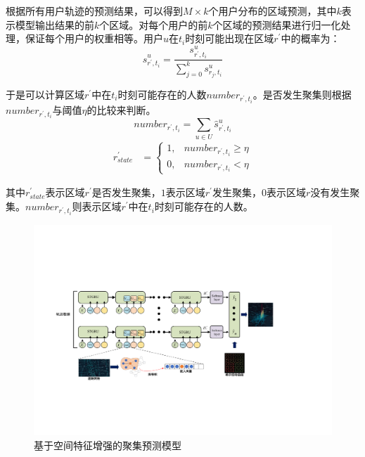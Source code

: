 \documentclass[master]{thesis-uestc}
\begin{document}
根据所有用户轨迹的预测结果，可以得到$M\times k$个用户分布的区域预测，其中$k$表示模型输出结果的前$k$个区域。对每个用户的前$k$个区域的预测结果进行归一化处理，保证每个用户的权重相等。用户$u$在$t_i$时刻可能出现在区域$r^{\prime}$中的概率为：
\begin{equation}
   \hat{s}^u_{r^{\prime},t_i} = \frac{s^u_{r^{\prime},t_i}}{\sum\limits_{j=0}^{k} s^u_{r_j,t_i}}
\end{equation}

于是可以计算区域$r^{\prime}$中在$t_i$时刻可能存在的人数$number_{r^{\prime},t_i}$。是否发生聚集则根据$number_{r^{\prime},t_i}$与阈值$\eta$的比较来判断。
\begin{equation}
   number_{r^{\prime},t_i} = \sum_{u\in U} \hat{s}^u_{r^{\prime},t_i}
\end{equation}
\begin{align}
    r^{\prime}_{state} &= 
        \begin{cases}
        1,& number_{r^{\prime},t_i}\ge \eta 
        \\
        0,& number_{r^{\prime},t_i}< \eta
        \end{cases}
\end{align}

其中$r^{\prime}_{state}$表示区域$r^{\prime}$是否发生聚集，$1$表示区域$r^{\prime}$发生聚集，$0$表示区域$r$没有发生聚集。$number_{r^{\prime},t_i}$则表示区域$r^{\prime}$中在$t_i$时刻可能存在的人数。

\begin{figure}[!ht]
\centering
\includegraphics[width=1.0\linewidth]{./pic/stgru_all_3.pdf}
\caption{基于空间特征增强的聚集预测模型}
\label{Figure.4.0.1}
\end{figure}
\end{document}
